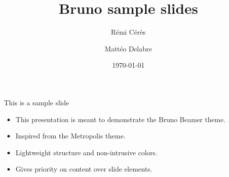\documentclass[aspectratio=169]{beamer}
\title{Bruno sample slides}
\author{
    Rémi Cérès \and
    Mattéo Delabre
}
\institute{Université de Montpellier}
\date{\today}
\begin{document}
\maketitle

\begin{frame}{This is a sample slide}
\begin{itemize}
    \item This presentation is meant to demonstrate the Bruno Beamer theme.
    \item Inspired from the Metropolis theme.
    \item Lightweight structure and non-intrusive colors.
    \item Gives priority on content over slide elements.
\end{itemize}
\end{frame}
\end{document}
